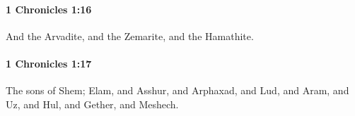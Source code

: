 		\paragraph{1 Chronicles 1:16} %
			\label{1CHRONICLES-1-16}

			And the Arvadite, and the Zemarite, and the Hamathite.


		\paragraph{1 Chronicles 1:17} %
			\label{1CHRONICLES-1-17}

			The sons of Shem; Elam, and Asshur, and Arphaxad, and Lud, and Aram, and Uz, and Hul, and Gether, and Meshech.


